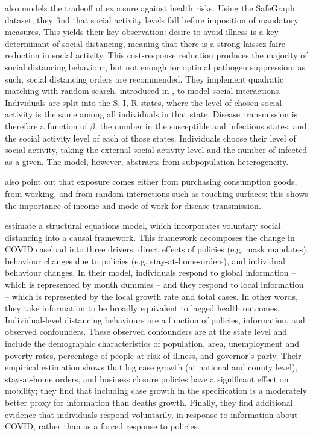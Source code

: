 \documentclass{article}
\begin{document}
\textcite{farboodiInternalExternalEffects2020} also models the tradeoff of exposure against health risks. Using the SafeGraph dataset, they find that social activity levels fall before imposition of mandatory measures. This yields their key observation: desire to avoid illness is a key determinant of social distancing, meaning that there is a strong laissez-faire reduction in social activity. This cost-response reduction produces the majority of social distancing behaviour, but not enough for optimal pathogen suppression; as such, social distancing orders are recommended. They implement quadratic matching with random search, introduced in \textcite{diamondEquilibriumAnalysisSearch1979}, to model social interactions. Individuals are split into the S, I, R states, where the level of chosen social activity is the same among all individuals in that state. Disease transmission is therefore a function of \(\beta\), the number in the susceptible and infectious states, and the social activity level of each of those states. Individuals choose their level of social activity, taking the external social activity level and the number of infected as a given. The model, however, abstracts from subpopulation heterogeneity.

\textcite{eichenbaumMacroeconomicsEpidemics2020} also point out that exposure comes either from purchasing consumption goods, from working, and from random interactions such as touching surfaces: this shows the importance of income and mode of work for disease transmission. 

\textcite{chernozhukovCausalImpactMasks2021} estimate a structural equations model, which incorporates voluntary social distancing into a causal framework. This framework decomposes the change in COVID caseload into three drivers: direct effects of policies (e.g. mask mandates), behaviour changes due to policies (e.g. stay-at-home-orders), and individual behaviour changes. In their model, individuals respond to global information -- which is represented by month dummies -- and they respond to local information -- which is represented by the local growth rate and total cases. In other words, they take information to be broadly equivalent to lagged health outcomes. Individual-level distancing behaviours are a function of policies, information, and observed confounders. These observed confounders are at the state level and include the demographic characteristics of population, area, unemployment and poverty rates, percentage of people at risk of illness, and governor's party. Their empirical estimation shows that log case growth (at national and county level), stay-at-home orders, and business closure policies have a significant effect on mobility; they find that including case growth in the specification is a moderately better proxy for information than deaths growth. Finally, they find additional evidence that individuals respond voluntarily, in response to information about COVID, rather than as a forced response to policies.
\end{document}
